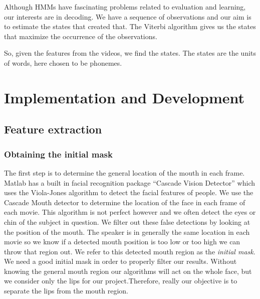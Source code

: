 \documentclass[a4paper]{article}
\begin{document}
Although HMMs have fascinating problems related to evaluation and learning, our interests are in decoding. We have a sequence of observations and our aim is to estimate the states that created that. The Viterbi algorithm \cite{key-3} gives us the states that maximize the occurrence of the observations. 

So, given the features from the videos, we find the states. The states are the units of words, here chosen to be phonemes. 
\section{Implementation and Development}

\subsection{Feature extraction}

\subsubsection{Obtaining the initial mask}
The first step is to determine the general location of the mouth in each frame. Matlab has a built in facial recognition package ``Cascade Vision Detector'' which uses the Viola-Jones algorithm to detect the facial features of people. We use the Cascade Mouth detector to determine the location of the face in each frame of each movie. This algorithm is not perfect however and we often detect the eyes or chin of the subject in question. We filter out these false detections by looking at the position of the mouth. The speaker is in generally the same location in each movie so we know if a detected mouth position is too low or too high we can throw that region out. We refer to this detected mouth region as the \textit{initial mask}. We need a good initial mask in order to properly filter our results. Without knowing the general mouth region our algorithms will act on the whole face, but we consider only the lips for our project.Therefore, really our objective is to separate the lips from the mouth region.\par
\end{document}
